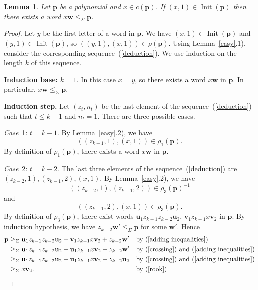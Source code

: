 \documentclass[12pt,draft]{amsart}
\newtheorem{lemma}{Lemma}
\DeclareMathOperator{\init}{Init}
\begin{document}
\begin{lemma}
\label{first letters} Let $\mathbf p$ be a polynomial and $x\in c(\mathbf p)$. If $(x,1)\in\init(\mathbf p)$ then there exists a word $x\mathbf w\le_{\Sigma}\mathbf p$.
\end{lemma}
\begin{proof}
Let $y$ be the first letter of a word in $\mathbf p$. We have $(x,1)\in\init(\mathbf p)$ and $(y,1)\in\init(\mathbf p)$, so $((y,1),(x,1))\in\rho(\mathbf p)$. Using Lemma~\ref{easy}.1), consider the corresponding sequence~(\ref{deduction}). We use induction on the length $k$ of this sequence. 

\textbf{Induction base:} $k=1$. In this case $x=y$, so there exists a word $x\mathbf w$ in $\mathbf p$. In particular, $x\mathbf w\le_{\Sigma}\mathbf p$.

\textbf{Induction step.} Let $(z_t,n_t)$ be the last element of the sequence~(\ref{deduction}) such that $t\le k-1$ and $n_t=1$. There are three possible cases.

\emph{Case}~1: $t=k-1$. By Lemma~\ref{easy}.2), we have 
$$((z_{k-1},1),(x,1))\in\rho_1(\mathbf p).$$ 
By definition of $\rho_1(\mathbf p)$, there exists a word $x\mathbf w$ in $\mathbf p$.

\emph{Case}~2: $t=k-2$. The last three elements of the sequence~(\ref{deduction}) are $(z_{k-2},1),(z_{k-1},2),(x,1)$. By Lemma~\ref{easy}.2), we have 
$$((z_{k-2},1),(z_{k-1},2))\in\rho_3(\mathbf p)^{-1}$$ 
and 
$$((z_{k-1},2),(x,1))\in\rho_3(\mathbf p).$$
By definition of $\rho_3(\mathbf p)$, there exist words $\mathbf u_1z_{k-1}z_{k-2}\mathbf u_2$, $\mathbf v_1z_{k-1}x\mathbf v_2$ in $\mathbf p$. By induction hypothesis, we have $z_{k-2}\mathbf w'\le_{\Sigma}\mathbf p$ for some $\mathbf w'$. Hence
\begin{align*}
\mathbf p&\ge_{\Sigma}\mathbf u_1z_{k-1}z_{k-2}\mathbf u_2+\mathbf v_1z_{k-1}x\mathbf v_2+z_{k-2}\mathbf w'&&\text{by~(\ref{adding inequalities})}\\
&\ge_{\Sigma}\mathbf u_1z_{k-1}z_{k-2}\mathbf u_2+\mathbf u_1z_{k-1}x\mathbf v_2+z_{k-2}\mathbf w'&&\text{by~(\ref{crossing}) and~(\ref{adding inequalities})}\\
&\ge_{\Sigma}\mathbf u_1z_{k-1}z_{k-2}\mathbf u_2+\mathbf u_1z_{k-1}x\mathbf v_2+z_{k-2}\mathbf u_2&&\text{by~(\ref{crossing}) and~(\ref{adding inequalities})}\\
&\ge_{\Sigma}x\mathbf v_2.&&\text{by~(\ref{rook})}
\end{align*}


\end{proof}
\end{document}
